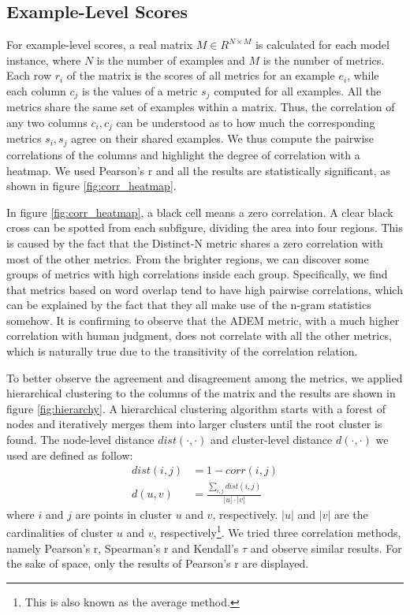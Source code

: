 \documentclass[runningheads]{llncs}
\begin{document}
    \subsection{Example-Level Scores}
    
    For example-level scores, a real matrix $M \in R^{N \times M}$ is calculated for each model instance, where $N$ is the number of examples and $M$ is the number of metrics. Each row $r_i$ of the matrix is the scores of all metrics for an example $e_i$, while each column $c_j$ is the values of a metric $s_j$ computed for all examples. All the metrics share the same set of examples within a matrix. Thus, the correlation of any two columns $c_i, c_j$ can be understood as to how much the corresponding metrics $s_i, s_j$ agree on their shared examples. We thus compute the pairwise correlations of the columns and highlight the degree of correlation with a heatmap. We used Pearson's r and all the results are statistically significant, as shown in figure \ref{fig:corr_heatmap}.

    In figure \ref{fig:corr_heatmap}, a black cell means a zero correlation. A clear black cross can be spotted from each subfigure, dividing the area into four regions. This is caused by the fact that the Distinct-N metric shares a zero correlation with most of the other metrics. From the brighter regions, we can discover some groups of metrics with high correlations inside each group. Specifically, we find that metrics based on word overlap tend to have high pairwise correlations, which can be explained by the fact that they all make use of the n-gram statistics somehow. It is confirming to observe that the ADEM metric, with a much higher correlation with human judgment, does not correlate with all the other metrics, which is naturally true due to the transitivity of the correlation relation.

    To better observe the agreement and disagreement among the metrics, we applied hierarchical clustering to the columns of the matrix and the results are shown in figure \ref{fig:hierarchy}. A hierarchical clustering algorithm starts with a forest of nodes and iteratively merges them into larger clusters until the root cluster is found. The node-level distance $\textit{dist}(\cdot, \cdot)$ and cluster-level distance $d(\cdot, \cdot)$ we used are defined as follow:
    \begin{align}
        \textit{dist}(i, j) &= 1 - \textit{corr}(i, j) \\
        d(u, v) &= \frac{\sum_{i,j}\textit{dist}(i, j)}{|u| \cdot |v|}
    \end{align}
    where $i$ and $j$ are points in cluster $u$ and $v$, respectively. $|u|$ and $|v|$ are the cardinalities of cluster $u$ and $v$, respectively\footnote{This is also known as the average method.}. We tried three correlation methods, namely Pearson's r, Spearman's r and Kendall's $\tau$ and observe similar results. For the sake of space, only the results of Pearson's r are displayed.
\end{document}
